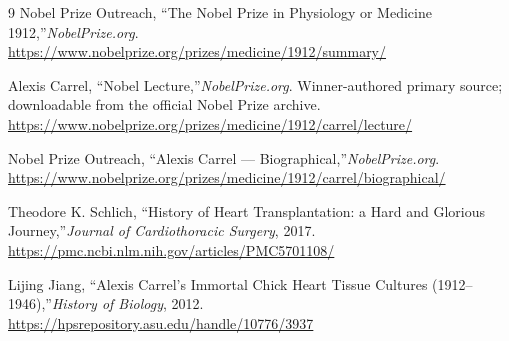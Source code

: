\begin{thebibliography}{9}
Nobel Prize Outreach, ``The Nobel Prize in Physiology or Medicine 1912,''\emph{NobelPrize.org}.\\
\url{https://www.nobelprize.org/prizes/medicine/1912/summary/}

Alexis Carrel, ``Nobel Lecture,''\emph{NobelPrize.org}. Winner-authored primary source; downloadable from the official Nobel Prize archive.\\
\url{https://www.nobelprize.org/prizes/medicine/1912/carrel/lecture/}

Nobel Prize Outreach, ``Alexis Carrel --- Biographical,''\emph{NobelPrize.org}.\\
\url{https://www.nobelprize.org/prizes/medicine/1912/carrel/biographical/}

Theodore K. Schlich, ``History of Heart Transplantation: a Hard and Glorious Journey,''\emph{Journal of Cardiothoracic Surgery}, 2017.\\
\url{https://pmc.ncbi.nlm.nih.gov/articles/PMC5701108/}

Lijing Jiang, ``Alexis Carrel's Immortal Chick Heart Tissue Cultures (1912--1946),''\emph{History of Biology}, 2012.\\
\url{https://hpsrepository.asu.edu/handle/10776/3937}
\end{thebibliography}

